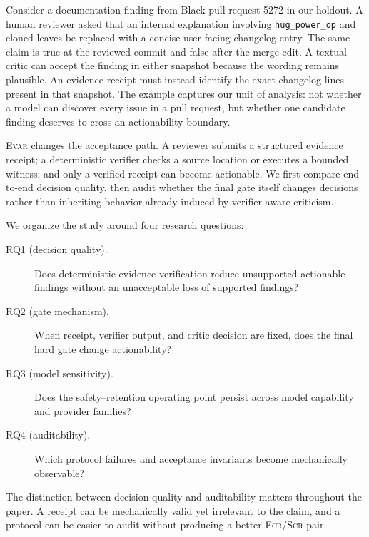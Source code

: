 \documentclass[acmsmall,screen,review,anonymous]{acmart}
\newcommand{\evar}{\textsc{Evar}\xspace}
\newcommand{\fcr}{\textsc{Fcr}\xspace}
\newcommand{\scr}{\textsc{Scr}\xspace}
\begin{document}
Consider a documentation finding from Black pull request 5272 in our holdout. A human reviewer asked that an internal explanation involving \texttt{hug\_power\_op} and cloned leaves be replaced with a concise user-facing changelog entry. The same claim is true at the reviewed commit and false after the merge edit. A textual critic can accept the finding in either snapshot because the wording remains plausible. An evidence receipt must instead identify the exact changelog lines present in that snapshot. The example captures our unit of analysis: not whether a model can discover every issue in a pull request, but whether one candidate finding deserves to cross an actionability boundary.

\evar changes the acceptance path. A reviewer submits a structured evidence receipt; a deterministic verifier checks a source location or executes a bounded witness; and only a verified receipt can become actionable. We first compare end-to-end decision quality, then audit whether the final gate itself changes decisions rather than inheriting behavior already induced by verifier-aware criticism.

We organize the study around four research questions:
\begin{description}
  \item[RQ1 (decision quality).] Does deterministic evidence verification reduce unsupported actionable findings without an unacceptable loss of supported findings?
  \item[RQ2 (gate mechanism).] When receipt, verifier output, and critic decision are fixed, does the final hard gate change actionability?
  \item[RQ3 (model sensitivity).] Does the safety--retention operating point persist across model capability and provider families?
  \item[RQ4 (auditability).] Which protocol failures and acceptance invariants become mechanically observable?
\end{description}
The distinction between decision quality and auditability matters throughout the paper. A receipt can be mechanically valid yet irrelevant to the claim, and a protocol can be easier to audit without producing a better \fcr/\scr pair.
\end{document}
